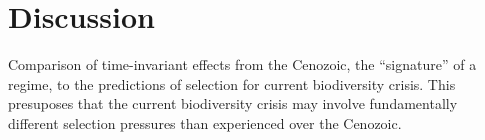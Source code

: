 \documentclass[12pt,letterpaper]{article}
\begin{document}
\section{Discussion}

Comparison of time-invariant effects from the Cenozoic, the ``signature'' of a regime, to the predictions of selection for current biodiversity crisis. This presuposes that the current biodiversity crisis may involve fundamentally different selection pressures than experienced over the Cenozoic.
\end{document}
